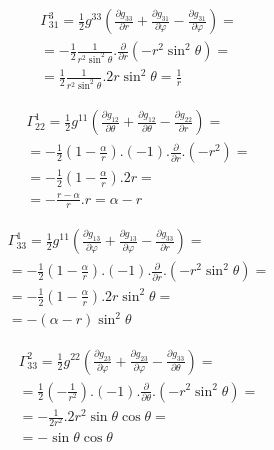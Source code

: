 \documentclass[a4paper,12pt]{article}
\begin{document}
    \begin{equation}
        \begin{aligned}
        \varGamma^3_{31} = \frac{1}{2}g^{33}\left(\frac{\partial g_{33}}{\partial r} + \frac{\partial g_{31}}{\partial \varphi} - \frac{\partial g_{31}}{\partial \varphi}\right) =\\
        = -\frac{1}{2}\frac{1}{r^2\sin^2\theta}.\frac{\partial}{\partial r}(-r^2\sin^2\theta) = \\
        = \frac{1}{2} \frac{1}{r^2\sin^2\theta}.2r\sin^2\theta = \frac{1}{r}
        \end{aligned}
    \end{equation}
    \newline

    \begin{equation}
        \begin{aligned}
        \varGamma^1_{22} = \frac{1}{2}g^{11}\left(\frac{\partial g_{12}}{\partial \theta} + \frac{\partial g_{12}}{\partial \theta} - \frac{\partial g_{22}}{\partial r}\right) =\\
        = -\frac{1}{2}\left(1- \frac{\alpha}{r}\right).(-1).\frac{\partial}{\partial r}.(-r^2) = \\
        = -\frac{1}{2} \left(1-\frac{\alpha}{r}\right).2r = \\
        = - \frac{r-\alpha}{r}.r = \alpha - r
        \end{aligned}
    \end{equation}
    \newline

    \begin{equation}
        \begin{aligned}
        \varGamma^1_{33} = \frac{1}{2}g^{11}\left(\frac{\partial g_{13}}{\partial \varphi} + \frac{\partial g_{13}}{\partial \varphi} - \frac{\partial g_{33}}{\partial r}\right) =\\
        = -\frac{1}{2}\left(1- \frac{\alpha}{r}\right).(-1).\frac{\partial}{\partial r}.(-r^2\sin^2\theta) = \\
        = -\frac{1}{2} \left(1-\frac{\alpha}{r}\right).2r\sin^2\theta = \\
        = - (\alpha - r)\sin^2\theta
        \end{aligned}
    \end{equation}
    \newline

    \begin{equation}
        \begin{aligned}
        \varGamma^2_{33} = \frac{1}{2}g^{22}\left(\frac{\partial g_{23}}{\partial \varphi} + \frac{\partial g_{23}}{\partial \varphi} - \frac{\partial g_{33}}{\partial \theta}\right) =\\
        = \frac{1}{2}\left(- \frac{1}{r^2}\right).(-1).\frac{\partial}{\partial \theta}.(-r^2\sin^2\theta) = \\
        = -\frac{1}{2r^2}.2r^2\sin\theta\cos\theta = \\
        = -\sin\theta\cos\theta
        \end{aligned}
    \end{equation}
    \newline
\end{document}
